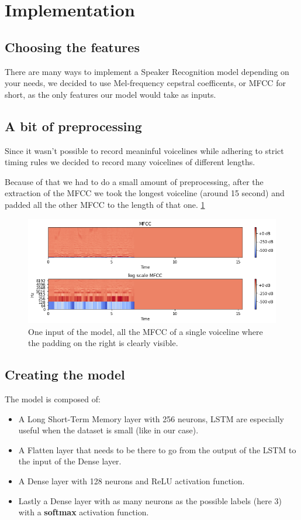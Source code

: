 \documentclass{article}
\begin{document}
\section{Implementation}
	\subsection{Choosing the features}
	There are many ways to implement a Speaker Recognition model depending on your needs, 
	we decided to use Mel-frequency cepstral coefficents, or MFCC for short, as the only features our model would take as inputs.

	\subsection{A bit of preprocessing}
	Since it wasn't possible to record meaninful voicelines while adhering to strict timing rules we decided to record many voicelines of different lengths.
	
	Because of that we had to do a small amount of preprocessing, after the extraction of the MFCC we took the longest voiceline (around 15 second) 
	and padded all the other MFCC to the length of that one. \ref{fig:mfcc}

	\begin{figure}
	\centering
	\includegraphics[width = \textwidth]{mfcc}
	\caption{One input of the model, all the MFCC of a single voiceline where the padding on the right is clearly visible.}
	\label{fig:mfcc}
	\end{figure}

	\subsection{Creating the model}
	The model is composed of:
	\begin{itemize}
	\item A Long Short-Term Memory layer with 256 neurons, LSTM are especially useful when the dataset is small (like in our case).
	\item A Flatten layer that needs to be there to go from the output of the LSTM to the input of the Dense layer.
	\item A Dense layer with 128 neurons and ReLU activation function.
	\item Lastly a Dense layer with as many neurons as the possible labels (here 3) with a {\bf softmax} activation function.
	\end{itemize}
\end{document}
